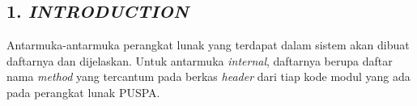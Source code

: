 \subsection*{\textcolor{subsectioncolor}{\textsf{1. \textit{INTRODUCTION}}}}

Antarmuka-antarmuka perangkat lunak yang terdapat dalam sistem akan dibuat daftarnya dan dijelaskan.
Untuk antarmuka \textit{internal},
daftarnya berupa daftar nama \textit{method} yang tercantum pada berkas \textit{header} dari tiap kode modul yang ada pada perangkat lunak PUSPA.
